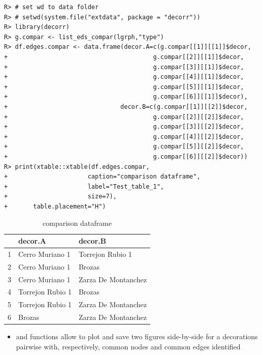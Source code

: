 \documentclass[article]{jss}\usepackage{knitr}
\begin{document}
\begin{kframe}
\begin{verbatim}
R> # set wd to data folder
R> # setwd(system.file("extdata", package = "decorr"))
R> library(decorr)
R> g.compar <- list_eds_compar(lgrph,"type")
R> df.edges.compar <- data.frame(decor.A=c(g.compar[[1]][[1]]$decor,
+                                        g.compar[[2]][[1]]$decor,
+                                        g.compar[[3]][[1]]$decor,
+                                        g.compar[[4]][[1]]$decor,
+                                        g.compar[[5]][[1]]$decor,
+                                        g.compar[[6]][[1]]$decor),
+                               decor.B=c(g.compar[[1]][[2]]$decor,
+                                        g.compar[[2]][[2]]$decor,
+                                        g.compar[[3]][[2]]$decor,
+                                        g.compar[[4]][[2]]$decor,
+                                        g.compar[[5]][[2]]$decor,
+                                        g.compar[[6]][[2]]$decor))
R> print(xtable::xtable(df.edges.compar,
+                      caption="comparison dataframe",
+                      label="Test_table_1",
+                      size=7),
+       table.placement="H")
\end{verbatim}
\end{kframe}%
\begin{table}[H]
\centering
\begin{tabular}{rll}
  \hline
 & decor.A & decor.B \\ 
  \hline
1 & Cerro Muriano 1 & Torrejon Rubio 1 \\ 
  2 & Cerro Muriano 1 & Brozas \\ 
  3 & Cerro Muriano 1 & Zarza De Montanchez \\ 
  4 & Torrejon Rubio 1 & Brozas \\ 
  5 & Torrejon Rubio 1 & Zarza De Montanchez \\ 
  6 & Brozas & Zarza De Montanchez \\ 
   \hline
\end{tabular}
\caption{comparison dataframe} 
\label{Test_table_1}
\end{table}


\begin{itemize} 
\setlength\itemsep{.1em}
  \item {} and  functions allow to plot and save two figures side-by-side for a decorations pairwise with, respectively, common nodes and common edges identified
\end{itemize}
\end{document}
